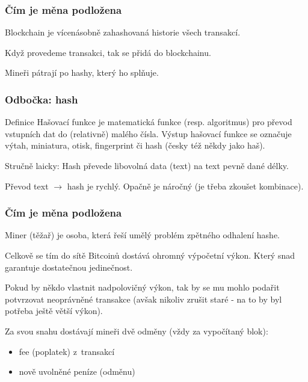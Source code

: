 \documentclass[xetex]{beamer}
\begin{document}
\begin{frame}
	\frametitle{Čím je měna podložena}

	Blockchain je vícenásobně zahashovaná historie všech transakcí. 

	\bigskip

	Když provedeme transakci, tak se přidá do blockchainu. 

	\bigskip

	Mineři pátrají po hashy, který ho splňuje.
\end{frame}

\begin{frame}
	\frametitle{Odbočka: hash}
	
	\begin{block}{Definice}
	Hašovací funkce je matematická funkce (resp. algoritmus) pro převod vstupních dat do (relativně) malého čísla. Výstup hašovací funkce se označuje výtah, miniatura, otisk, fingerprint či hash (česky též někdy jako haš).
	\end{block}

	\bigskip

	Stručně laicky: Hash převede libovolná data (text) na text pevně dané délky. 

	\bigskip

	Převod text $\rightarrow$ hash je rychlý. Opačně je náročný (je třeba zkoušet kombinace).

\end{frame}

\begin{frame}
	\frametitle{Čím je měna podložena}
	Miner (těžař) je osoba, která řeší umělý problém zpětného odhalení hashe.

	\bigskip

	Celkově se tím do sítě Bitcoinů dostává ohromný výpočetní výkon. Který snad garantuje dostatečnou jedinečnost.

	\bigskip

	Pokud by někdo vlastnit nadpolovičný výkon, tak by se mu mohlo podařit potvrzovat neoprávněné transakce (avšak nikoliv zrušit staré - na to by byl potřeba ještě větší výkon).

	\bigskip

	Za svou snahu dostávají mineři dvě odměny (vždy za vypočítaný blok):
	\begin{itemize}
		\item fee (poplatek) z~transakcí
		\item nově uvolněné peníze (odměnu)
	\end{itemize}
\end{frame}
\end{document}
